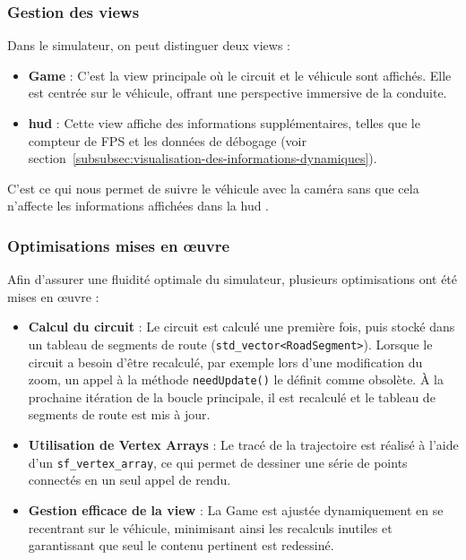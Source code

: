 \subsubsection{Gestion des \glspl{view}}\label{subsubsec:gestion-des-vues}
Dans le simulateur, on peut distinguer deux \glspl{view} :
\begin{itemize}
    \item \textbf{Game } : C'est la \gls{view} principale où le circuit et le véhicule sont affichés.
    Elle est centrée sur le véhicule, offrant une perspective immersive de la conduite.
    \item \textbf{\gls{hud} } : Cette \gls{view} affiche des informations supplémentaires, telles que le compteur de FPS et les données de débogage (voir section~\ref{subsubsec:visualisation-des-informations-dynamiques}).
\end{itemize}

C'est ce qui nous permet de suivre le véhicule avec la \og caméra \fg{} sans que cela n'affecte les informations affichées dans la \gls{hud} .

\subsubsection{Optimisations mises en œuvre}\label{subsubsec:optimisations-mises-en-oeuvre}
Afin d'assurer une fluidité optimale du simulateur, plusieurs optimisations ont été mises en œuvre :
\begin{itemize}
    \item \textbf{Calcul du circuit} : Le circuit est calculé une première fois, puis stocké dans un tableau de segments de route (\texttt{\gls{std_vector}<RoadSegment>}\cite{cpp_reference_vector}).
    Lorsque le circuit a besoin d'être recalculé, par exemple lors d'une modification du zoom, un appel à la méthode \texttt{needUpdate()} le définit comme obsolète.
    À la prochaine itération de la boucle principale, il est recalculé et le tableau de segments de route est mis à jour.
    \item \textbf{Utilisation de Vertex Arrays} : Le tracé de la trajectoire est réalisé à l'aide d'un \texttt{\gls{sf_vertex_array}}\cite{sfml_sf_vertexarray}, ce qui permet de dessiner une série de points connectés en un seul appel de rendu.
    \item \textbf{Gestion efficace de la \gls{view}} : La Game  est ajustée dynamiquement en se recentrant sur le véhicule, minimisant ainsi les recalculs inutiles et garantissant que seul le contenu pertinent est redessiné.
\end{itemize}

